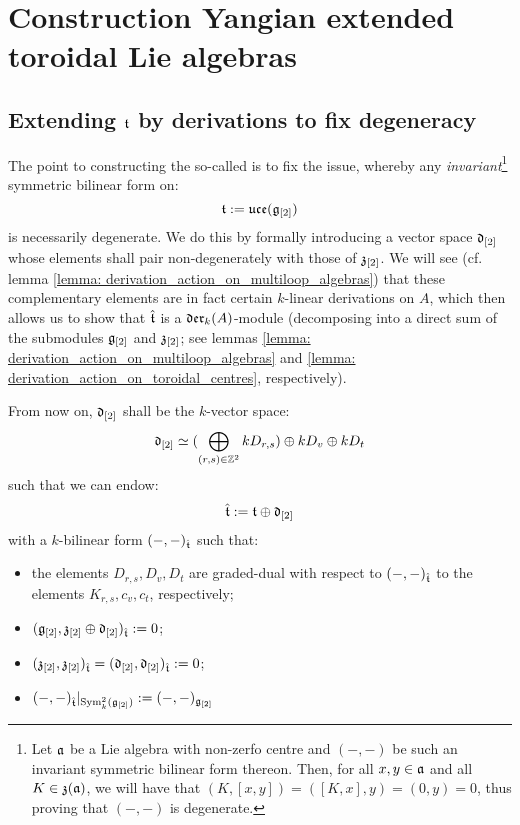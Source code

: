 \section{Construction Yangian extended toroidal Lie algebras}
    \subsection{Extending \texorpdfstring{$\mathfrak{t}$}{} by derivations to fix degeneracy}
        The point to constructing the so-called  is to fix the issue, whereby any \textit{invariant}\footnote{Let $\mathfrak{a}$ be a Lie algebra with non-zerfo centre and $(-, -)$ be such an invariant symmetric bilinear form thereon. Then, for all $x, y \in \mathfrak{a}$ and all $K \in \mathfrak{z}(\mathfrak{a})$, we will have that $(K, [x, y]) = ([K, x], y) = (0, y) = 0$, thus proving that $(-, -)$ is degenerate.} symmetric bilinear form on:
            $$\mathfrak{t}:= \mathfrak{uce}(\mathfrak{g}_{[2]})$$
        is necessarily degenerate. We do this by formally introducing a  vector space $\mathfrak{d}_{[2]}$ whose elements shall pair non-degenerately with those of $\mathfrak{z}_{[2]}$. We will see (cf. lemma \ref{lemma: derivation_action_on_multiloop_algebras}) that these complementary elements are in fact certain $k$-linear derivations on $A$, which then allows us to show that $\hat{\mathfrak{t}}$ is a $\mathfrak{der}_k(A)$-module (decomposing into a direct sum of the submodules $\mathfrak{g}_{[2]}$ and $\mathfrak{z}_{[2]}$; see lemmas \ref{lemma: derivation_action_on_multiloop_algebras} and \ref{lemma: derivation_action_on_toroidal_centres}, respectively).
        
        \begin{convention} \label{conv: orthogonal_complement_of_toroidal_centres}
            From now on, $\mathfrak{d}_{[2]}$ shall be the $k$-vector space:
                $$\mathfrak{d}_{[2]} \simeq ( \bigoplus_{(r, s) \in \mathbb{Z}^2} k D_{r, s} ) \oplus k D_v \oplus k D_t$$
            such that we can endow:
                $$\hat{\mathfrak{t}} := \mathfrak{t}\oplus \mathfrak{d}_{[2]}$$
            with a $k$-bilinear form $(-, -)_{\hat{\mathfrak{t}}}$ such that:
            \begin{itemize}
                \item the elements $D_{r, s}, D_v, D_t$ are graded-dual with respect to $(-, -)_{\hat{\mathfrak{t}}}$ to the elements $K_{r, s}, c_v, c_t$, respectively;
                \item $(\mathfrak{g}_{[2]}, \mathfrak{z}_{[2]} \oplus \mathfrak{d}_{[2]})_{\hat{\mathfrak{t}}} := 0$;
                \item $(\mathfrak{z}_{[2]}, \mathfrak{z}_{[2]})_{\hat{\mathfrak{t}}} = (\mathfrak{d}_{[2]}, \mathfrak{d}_{[2]})_{\hat{\mathfrak{t}}} := 0$;
                \item $(-, -)_{\hat{\mathfrak{t}}}|_{\mathrm{Sym}^2_{k}(\mathfrak{g}_{[2]})} := (-, -)_{\mathfrak{g}_{[2]}}$
            \end{itemize}
        \end{convention}

